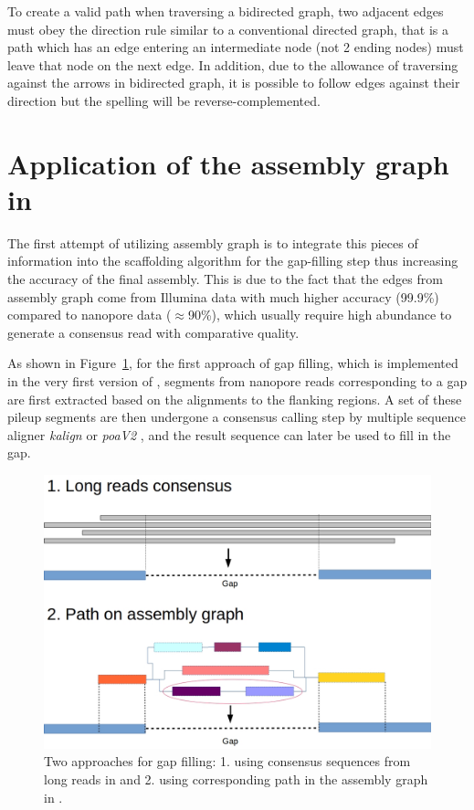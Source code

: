 To create a valid path when traversing a bidirected graph, two adjacent edges must obey the direction rule similar to a conventional directed graph, that is a path which has an edge entering an intermediate node (not 2 ending nodes) must leave that node on the next edge. In addition, due to the allowance of traversing against the arrows in bidirected graph, it is possible to follow edges against their direction but the spelling will be reverse-complemented.

\section{Application of the assembly graph in \npscarfg{}}\label{sec:npscarfwag}
The first attempt of utilizing assembly graph is to integrate this pieces of information into the scaffolding algorithm for the gap-filling step thus increasing the accuracy of the final assembly. This is due to the fact that the edges from assembly graph come from Illumina data with much higher accuracy (99.9\%) compared to nanopore data ($\approx$90\%), which usually require high abundance to generate a consensus read with comparative quality. 

As shown in Figure~\ref{f:gapfilling}, for the first approach of gap filling, which is implemented in the very first version of \npscarf{}, segments from nanopore reads corresponding to a gap are first extracted based on the alignments to the flanking regions. A set of these pileup segments are then undergone a consensus calling step by multiple sequence aligner \EG{} \emph{kalign} \cite{LassmannFS2009} or \emph{poaV2} \cite{Lee2002multiple,Lee2003generating,Grasso2004combining}, and the result sequence can later be used to fill in the gap. 

\begin{figure}[!ht]
\centering
\includegraphics[width=.7\linewidth]{images/gapfilling.jpg}
\caption[Two approaches for gap filling in our methods.]
{Two approaches for gap filling: 1. using consensus sequences from long reads in \npscarf{}  and 2. using corresponding path in the assembly graph in \npscarfg{} .}
\label{f:gapfilling}
\end{figure}

